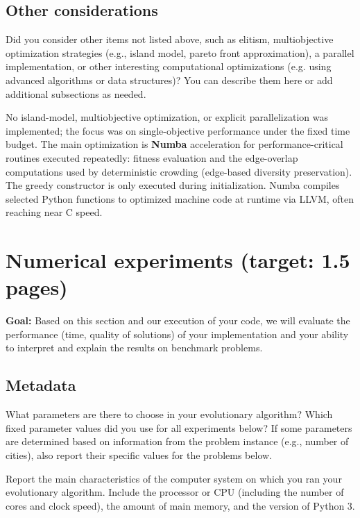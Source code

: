 \documentclass[a4paper,10pt]{article}
\newcommand{\ReplaceMe}[1]{{\color{blue}#1}}
\newcommand{\RemoveMe}[1]{{\color{purple}#1}}
\begin{document}
\subsection{Other considerations}\label{sec_oth}

\ReplaceMe{Did you consider other items not listed above, such as elitism, multiobjective optimization strategies (e.g., island model, pareto front approximation), a parallel implementation, or other interesting computational optimizations (e.g. using advanced algorithms or data structures)? You can describe them here or add additional subsections as needed.}

No island-model, multiobjective optimization, or explicit parallelization was implemented; the focus was on
single-objective performance under the fixed time budget. The main optimization is \textbf{Numba} acceleration
for performance-critical routines executed repeatedly: fitness evaluation and the edge-overlap computations used
by deterministic crowding (edge-based diversity preservation). The greedy constructor is only executed during
initialization. Numba compiles selected Python functions to optimized machine code at runtime via LLVM, often
reaching near C speed.

\section{Numerical experiments \hfill(target: 1.5 pages)}

\RemoveMe{\textbf{Goal:} Based on this section and our execution of your code, we will evaluate the performance (time, quality of solutions) of your implementation and your ability to interpret and explain the results on benchmark problems.}

\subsection{Metadata}

\ReplaceMe{What parameters are there to choose in your evolutionary algorithm? Which fixed parameter values did you use for all experiments below? If some parameters are determined based on information from the problem instance (e.g., number of cities), also report their specific values for the problems below.

Report the main characteristics of the computer system on which you ran your evolutionary algorithm. Include the processor or CPU (including the number of cores and clock speed), the amount of main memory, and the version of Python 3.}
\end{document}
